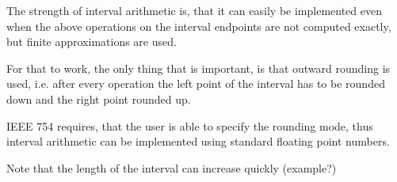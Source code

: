 	The strength of interval arithmetic is, that it can easily be implemented even when the above 
	operations on the interval endpoints are not computed exactly, but finite approximations are used.
	
	For that to work, the only thing that is important, is that outward rounding is used, i.e. 
	after every operation the left point of the interval has to be rounded down and the right point rounded up.

	IEEE 754 requires, that the user is able to specify the rounding mode, thus interval arithmetic can be implemented 
	using standard floating point numbers.

	Note that the length of the interval can increase quickly  (example?)

	

